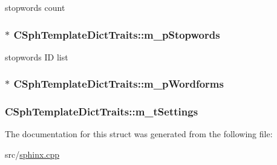 stopwords count 

\hypertarget{structCSphTemplateDictTraits_ab6b4b575f3d4fa1c4e2dfda1940ab853}{
\subsubsection[{m\-\_\-p\-Stopwords}]{$\ast$ C\-Sph\-Template\-Dict\-Traits\-::m\-\_\-p\-Stopwords\hspace{0.3cm}{\ttfamily [protected]}}}\label{structCSphTemplateDictTraits_ab6b4b575f3d4fa1c4e2dfda1940ab853}


stopwords I\-D list 

\hypertarget{structCSphTemplateDictTraits_af1c9ed3298346175146080fe435d841a}{
\subsubsection[{m\-\_\-p\-Wordforms}]{$\ast$ C\-Sph\-Template\-Dict\-Traits\-::m\-\_\-p\-Wordforms\hspace{0.3cm}{\ttfamily [private]}}}\label{structCSphTemplateDictTraits_af1c9ed3298346175146080fe435d841a}
\hypertarget{structCSphTemplateDictTraits_a1df7a3c269a8219780046fd7017ee93a}{
\subsubsection[{m\-\_\-t\-Settings}]{ C\-Sph\-Template\-Dict\-Traits\-::m\-\_\-t\-Settings\hspace{0.3cm}{\ttfamily [private]}}}\label{structCSphTemplateDictTraits_a1df7a3c269a8219780046fd7017ee93a}


The documentation for this struct was generated from the following file\-:\begin{DoxyCompactItemize}
\item 
src/\hyperlink{sphinx_8cpp}{sphinx.\-cpp}\end{DoxyCompactItemize}
